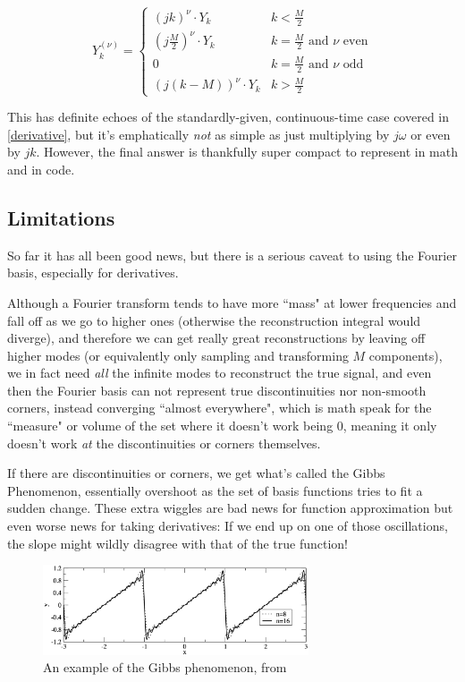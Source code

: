 \documentclass[10pt]{article}
\begin{document}
\begin{equation}\label{Y_nu}
Y^{(\nu)}_k = \begin{cases} (j k)^\nu \cdot Y_k & k < \frac{M}{2} \\ (j \frac{M}{2})^\nu \cdot Y_k & k = \frac{M}{2} \text{ and } \nu \text{ even} \\ 0 & k = \frac{M}{2} \text{ and } \nu \text{ odd} \\ (j(k - M))^\nu \cdot Y_k & k > \frac{M}{2} \end{cases}
\end{equation}

This has definite echoes of the standardly-given, continuous-time case covered in \autoref{derivative}, but it's emphatically \textit{not} as simple as just multiplying by $j\omega$ or even by $j k$. However, the final answer is thankfully super compact to represent in math and in code.

\subsection{Limitations}

So far it has all been good news, but there is a serious caveat to using the Fourier basis, especially for derivatives.

Although a Fourier transform tends to have more ``mass" at lower frequencies and fall off as we go to higher ones (otherwise the reconstruction integral would diverge), and therefore we can get really great reconstructions by leaving off higher modes\cite{kutz} (or equivalently only sampling and transforming $M$ components), we in fact need \textit{all} the infinite modes to reconstruct the true signal\cite{oppenheim}, and even then the Fourier basis can not represent true discontinuities nor non-smooth corners, instead converging ``almost everywhere", which is math speak for the ``measure" or volume of the set where it doesn't work being 0, meaning it only doesn't work \textit{at} the discontinuities or corners themselves.\cite{oppenheim}

If there are discontinuities or corners, we get what's called the Gibbs Phenomenon\cite{oppenheim}, essentially overshoot as the set of basis functions tries to fit a sudden change. These extra wiggles are bad news for function approximation but even worse news for taking derivatives: If we end up on one of those oscillations, the slope might wildly disagree with that of the true function!

\begin{figure}[h!]
	\centering
	\includegraphics[width=0.7\textwidth]{gibbs.png}
	\caption*{An example of the Gibbs phenomenon, from \cite{kutz}}
\end{figure}
\end{document}
